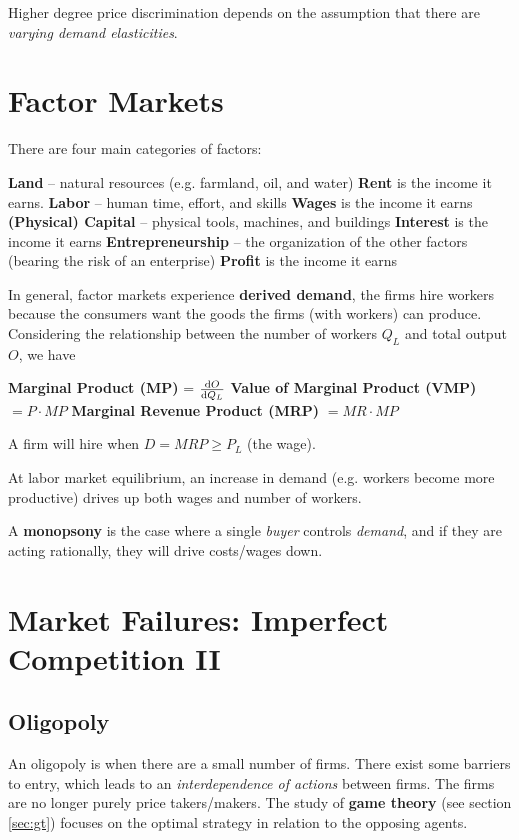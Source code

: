 \documentclass{article}
\def\term #1{\termb{#1} --}
\def\termb #1{\1 \textbf{#1}}
\def\termbB #1{\2 \textbf{#1}}
\begin{document}
Higher degree price discrimination depends on the assumption that there are \textit{varying demand elasticities}.
\section{Factor Markets}
There are four main categories of factors:
\begin{outline}
	\term{Land} natural resources (e.g. farmland, oil, and water)
	\termbB{Rent} is the income it earns.
	\term{Labor} human time, effort, and skills
	\termbB{Wages} is the income it earns
	\term{(Physical) Capital} physical tools, machines, and buildings
	\termbB{Interest} is the income it earns
	\term{Entrepreneurship} the organization of the other factors (bearing the risk of an enterprise)
	\termbB{Profit} is the income it earns
\end{outline}

In general, factor markets experience \textbf{derived demand}, the firms hire workers because the consumers want the goods the firms (with workers) can produce. Considering the relationship between the number of workers $Q_L$ and total output $O$, we have
\begin{outline}
    \termb{Marginal Product (MP)} = $\dv{O}{Q_L}$
	\termb{Value of Marginal Product (VMP)} $= P\cdot MP$
	\termb{Marginal Revenue Product (MRP)} $= MR\cdot MP$
\end{outline}
A firm will hire when $D=MRP\ge P_L$ (the wage).

At labor market equilibrium, an increase in demand (e.g. workers become more productive)  drives up both wages and number of workers.

A \textbf{monopsony} is the case where a single \textit{buyer} controls \textit{demand}, and if they are acting rationally, they will drive costs/wages down.

\section{Market Failures: Imperfect Competition II}
\subsection{Oligopoly}
An oligopoly is when there are a small number of firms. There exist some barriers to entry, which leads to an \textit{interdependence of actions} between firms. The firms are no longer purely price takers/makers. The study of \textbf{game theory} (see section \ref{sec:gt}) focuses on the optimal strategy in relation to the opposing agents.
\end{document}
